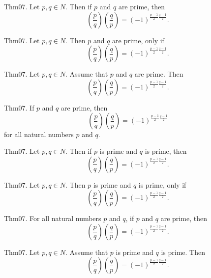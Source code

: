 \documentclass{article}
\begin{document}
Thm07. Let $p , q \in N$. Then if $p$ and $q$ are prime, then $$\left(\frac{ p }{ q }\right) \left(\frac{ q }{ p }\right) = (- 1)^ {\frac{ p - 1}{2}\frac{ q - 1}{2}}.$$

Thm07. Let $p , q \in N$. Then $p$ and $q$ are prime, only if $$\left(\frac{ p }{ q }\right) \left(\frac{ q }{ p }\right) = (- 1)^ {\frac{ p - 1}{2}\frac{ q - 1}{2}}.$$

Thm07. Let $p , q \in N$. Assume that $p$ and $q$ are prime. Then $$\left(\frac{ p }{ q }\right) \left(\frac{ q }{ p }\right) = (- 1)^ {\frac{ p - 1}{2}\frac{ q - 1}{2}}.$$

Thm07. If $p$ and $q$ are prime, then $$\left(\frac{ p }{ q }\right) \left(\frac{ q }{ p }\right) = (- 1)^ {\frac{ p - 1}{2}\frac{ q - 1}{2}}$$ for all natural numbers $p$ and $q$.

Thm07. Let $p , q \in N$. Then if $p$ is prime and $q$ is prime, then $$\left(\frac{ p }{ q }\right) \left(\frac{ q }{ p }\right) = (- 1)^ {\frac{ p - 1}{2}\frac{ q - 1}{2}}.$$

Thm07. Let $p , q \in N$. Then $p$ is prime and $q$ is prime, only if $$\left(\frac{ p }{ q }\right) \left(\frac{ q }{ p }\right) = (- 1)^ {\frac{ p - 1}{2}\frac{ q - 1}{2}}.$$

Thm07. For all natural numbers $p$ and $q$, if $p$ and $q$ are prime, then $$\left(\frac{ p }{ q }\right) \left(\frac{ q }{ p }\right) = (- 1)^ {\frac{ p - 1}{2}\frac{ q - 1}{2}}.$$

Thm07. Let $p , q \in N$. Assume that $p$ is prime and $q$ is prime. Then $$\left(\frac{ p }{ q }\right) \left(\frac{ q }{ p }\right) = (- 1)^ {\frac{ p - 1}{2}\frac{ q - 1}{2}}.$$
\end{document}
